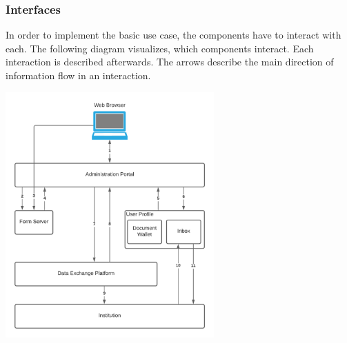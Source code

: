\documentclass[
     12pt,         %
     a4paper,      %
     BCOR=10mm,version=first,     %
     DIV=14,version=first,        %
     ]{scrreprt}
\begin{document}
\subsubsection{Interfaces}
In order to implement the basic use case, the components have to interact with each. The following diagram visualizes, which components interact. Each interaction is described afterwards. The arrows describe the main direction of information flow in an interaction.

\begin{center}
    \includegraphics[width=8cm]{Diagrams/Interaction Diagram.png}
\end{center}
\end{document}
